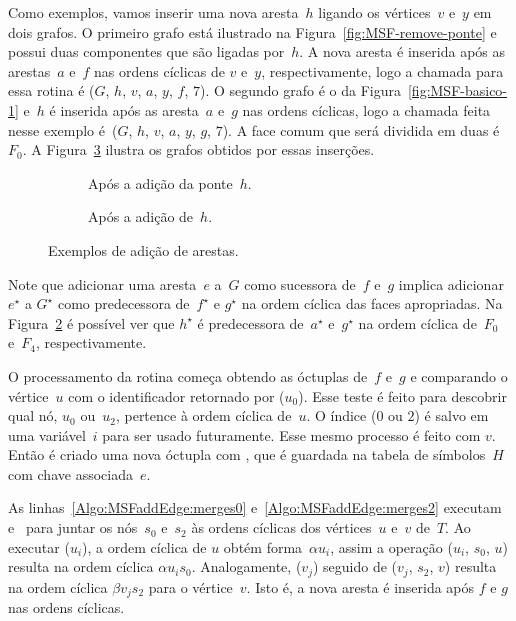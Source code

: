 Como exemplos, vamos inserir uma nova aresta~$h$ ligando os vértices~$v$ e~$y$ em dois grafos.
O primeiro grafo está ilustrado na Figura~\ref{fig:MSF-remove-ponte} e possui duas componentes que são ligadas por~$h$. 
A nova aresta é inserida após as arestas~$a$ e~$f$ nas ordens cíclicas de $v$ e~$y$, respectivamente, logo a chamada para essa rotina é \MSFaddEdge($G$, $h$, $v$, $a$, $y$, $f$, $7$).
O segundo grafo é o da Figura~\ref{fig:MSF-basico-1} e~$h$ é inserida após as aresta~$a$ e~$g$ nas ordens cíclicas, logo a chamada feita nesse exemplo é~\MSFaddEdge($G$, $h$, $v$, $a$, $y$, $g$, $7$).
A face comum que será dividida em duas é~$F_0$.
A Figura~\ref{fig:antes-depois-adiciona} ilustra os grafos obtidos por essas inserções.


\begin{figure}[htb]
\hspace{-2cm}
\begin{subfigure}{0.45\textwidth}

\caption{Após a adição da ponte~$h$.}
\label{fig:MSF-adiciona-ponte}
\end{subfigure}
\begin{subfigure}{0.45\textwidth}

\caption{Após a adição de~$h$.}
\label{fig:MSF-adiciona-nao-ponte}
\end{subfigure}
\caption{Exemplos de adição de arestas.}
\label{fig:antes-depois-adiciona}
\end{figure}

Note que adicionar uma aresta~$e$ a~$G$ como sucessora de~$f$ e~$g$ implica adicionar $e^\star$ a $G^\star$ como predecessora de~$f^\star$ e $g^\star$ na ordem cíclica das faces apropriadas.  
Na Figura~\ref{fig:MSF-adiciona-nao-ponte} é possível ver que $h^\star$ é predecessora de~$a^\star$ e~$g^\star$ na ordem cíclica de~$F_0$ e~$F_4$, respectivamente.


O processamento da rotina \MSFaddEdge{} começa obtendo as óctuplas de~$f$ e~$g$ e comparando o vértice~$u$ com o identificador retornado por \LCOFindNode($u_{0}$).
Esse teste é feito para descobrir qual nó, $u_0$ ou~$u_2$, pertence à ordem cíclica de~$u$.
O índice ($0$ ou $2$) é salvo em uma variável~$i$ para ser usado futuramente.
Esse mesmo processo é feito com $v$.
Então é criado uma nova óctupla com \LCOMakeOcto{}, que é guardada na tabela de símbolos~$H$ com chave associada~$e$.



As linhas~\ref{Algo:MSFaddEdge:merges0} e~\ref{Algo:MSFaddEdge:merges2} executam \LCOCycle{} e~\LCOMerge{} para juntar os nós~$s_0$ e~$s_2$ às ordens cíclicas dos vértices~$u$ e~$v$ de~$\hat T$.  
Ao executar \LCOCycle($u_i$), a ordem cíclica de $u$ obtém forma~$\alpha u_i$, assim a operação \LCOMerge($u_i$, $s_0$, $u$) resulta na ordem cíclica $\alpha u_is_0$.
Analogamente, \LCOCycle($v_j$) seguido de \LCOMerge($v_j$, $s_2$, $v$) resulta na ordem cíclica $\beta v_j s_2$ para o vértice~$v$.
Isto é, a nova aresta é inserida após $f$ e $g$ nas ordens cíclicas.


